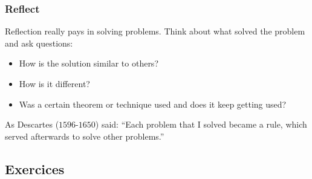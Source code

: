 \documentclass{beamer}
\begin{document}







\begin{frame}%
\frametitle{Reflect}


Reflection really pays in solving problems. Think about what solved the problem and ask
questions:
\begin{itemize}
\item<1-> How is the solution similar to others?\\
\item<1-> How is it different?\\
\item<1-> Was a certain theorem
or technique used and does it keep getting used?
\end{itemize}
\vspace{0.4cm}
As Descartes ($1596$-$1650$) said: ``Each problem that I solved became a rule, which served afterwards to solve other problems.''

\end{frame}

\subsection{Exercices}
\end{document}
